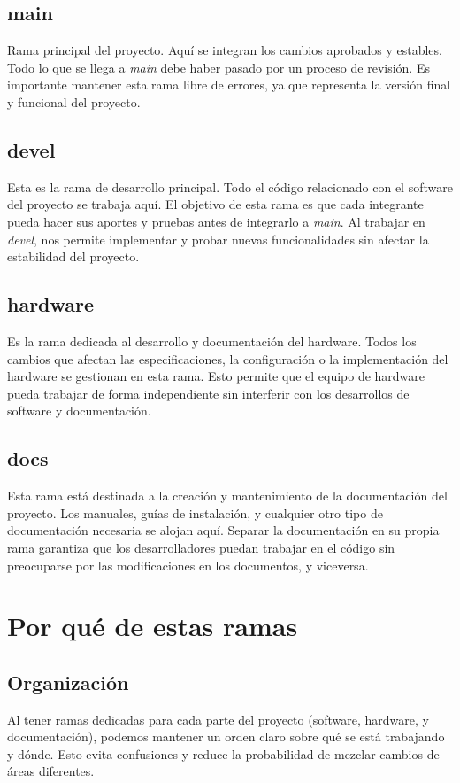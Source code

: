 \documentclass[a4paper]{article}
\begin{document}
    \subsection{main}
        \indent Rama principal del proyecto. Aquí se integran los cambios aprobados y estables. Todo lo que se llega a \textit{main} debe haber pasado por un proceso de revisión. Es importante mantener esta rama libre de errores, ya que representa la versión final y funcional del proyecto.

    \subsection{devel}
        \indent Esta es la rama de desarrollo principal. Todo el código relacionado con el software del proyecto se trabaja aquí. El objetivo de esta rama es que cada integrante pueda hacer sus aportes y pruebas antes de integrarlo a \textit{main}. Al trabajar en \textit{devel}, nos permite implementar y probar nuevas funcionalidades sin afectar la estabilidad del proyecto.

    \subsection{hardware}
        \indent Es la rama dedicada al desarrollo y documentación del hardware. Todos los cambios que afectan las especificaciones, la configuración o la implementación del hardware se gestionan en esta rama. Esto permite que el equipo de hardware pueda trabajar de forma independiente sin interferir con los desarrollos de software y documentación.

    \subsection{docs}
        \indent Esta rama está destinada a la creación y mantenimiento de la documentación del proyecto. Los manuales, guías de instalación, y cualquier otro tipo de documentación necesaria se alojan aquí. Separar la documentación en su propia rama garantiza que los desarrolladores puedan trabajar en el código sin preocuparse por las modificaciones en los documentos, y viceversa.

\section{Por qué de estas ramas}

    \subsection{Organización}
    \indent Al tener ramas dedicadas para cada parte del proyecto (software, hardware, y documentación), podemos mantener un orden claro sobre qué se está trabajando y dónde. Esto evita confusiones y reduce la probabilidad de mezclar cambios de áreas diferentes.
\end{document}
